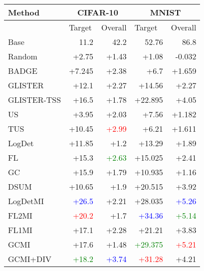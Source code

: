 \documentclass{article}
\begin{document}
\begin{table}[ht]
\begin{center}
\begin{tabular}{lrrrr}
\hline
Method               & \multicolumn{2}{c}{CIFAR-10}                                     & \multicolumn{2}{c}{MNIST}                                        \\ \hline
                     & \multicolumn{1}{l}{Target} & \multicolumn{1}{l}{Overall} & \multicolumn{1}{l}{Target} & \multicolumn{1}{l}{Overall} \\ \cline{2-5}
Base            & 11.2                               & 42.2                        & 52.76                               & 86.8 
\\
\hline
Random      & +2.75  & +1.43 & +1.08   & -0.032 \\
BADGE \citep{ash2020deep}       & +7.245 & +2.38 & +6.7    & +1.659 \\
GLISTER \citep{killamsetty2020glister}     & +12.1  & +2.27 & +14.56  & +2.27  \\
GLISTER-TSS & +16.5  & +1.78 & +22.895 & +4.05  \\
US \citep{settles2009active}          & +3.95  & +2.03 & +7.56   & +1.182 \\
TUS         & +10.45 & \textcolor{red}{+2.99} & +6.21   & +1.611 \\
LogDet      & +11.85 & +1.2  & +13.29  & +1.89  \\
FL          & +15.3  & \textcolor{green}{+2.63} & +15.025 & +2.41  \\
GC          & +15.9  & +1.79 & +10.935 & +1.16  \\
DSUM        & +10.65 & +1.9  & +20.515 & +3.92  \\ \hline
LogDetMI    & \textcolor{blue}{+26.5}  & +2.21 & +28.035 & \textcolor{blue}{+5.26}  \\
FL2MI       & \textcolor{red}{+20.2}  & +1.7  & \textcolor{blue}{+34.36}  & \textcolor{green}{+5.14}  \\
FL1MI       & +17.1  & +2.28 & +21.21  & +3.83  \\
GCMI        & +17.6  & +1.48 & \textcolor{green}{+29.375} & \textcolor{red}{+5.21}  \\
GCMI+DIV   & \textcolor{green}{+18.2}  & \textcolor{blue}{+3.74} & \textcolor{red}{+31.28}  & +4.21 \\


\end{tabular}
\end{center}
\end{table}
\end{document}
